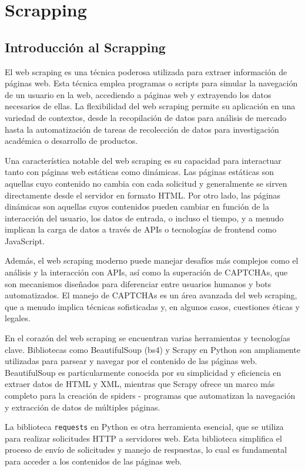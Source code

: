 \chapter{Scrapping}

    \section{Introducción al Scrapping}

    El web scraping es una técnica poderosa utilizada para extraer información de páginas web. Esta técnica emplea programas o scripts para simular la navegación de un usuario en la web, accediendo a páginas web y extrayendo los datos necesarios de ellas. La flexibilidad del web scraping permite su aplicación en una variedad de contextos, desde la recopilación de datos para análisis de mercado hasta la automatización de tareas de recolección de datos para investigación académica o desarrollo de productos.

    Una característica notable del web scraping es su capacidad para interactuar tanto con páginas web estáticas como dinámicas. Las páginas estáticas son aquellas cuyo contenido no cambia con cada solicitud y generalmente se sirven directamente desde el servidor en formato HTML. Por otro lado, las páginas dinámicas son aquellas cuyos contenidos pueden cambiar en función de la interacción del usuario, los datos de entrada, o incluso el tiempo, y a menudo implican la carga de datos a través de APIs o tecnologías de frontend como JavaScript.

    Además, el web scraping moderno puede manejar desafíos más complejos como el análisis y la interacción con APIs, así como la superación de CAPTCHAs, que son mecanismos diseñados para diferenciar entre usuarios humanos y bots automatizados. El manejo de CAPTCHAs es un área avanzada del web scraping, que a menudo implica técnicas sofisticadas y, en algunos casos, cuestiones éticas y legales.

    En el corazón del web scraping se encuentran varias herramientas y tecnologías clave. Bibliotecas como BeautifulSoup (bs4) y Scrapy en Python son ampliamente utilizadas para parsear y navegar por el contenido de las páginas web. BeautifulSoup es particularmente conocida por su simplicidad y eficiencia en extraer datos de HTML y XML, mientras que Scrapy ofrece un marco más completo para la creación de spiders - programas que automatizan la navegación y extracción de datos de múltiples páginas.

    La biblioteca \texttt{requests} en Python es otra herramienta esencial, que se utiliza para realizar solicitudes HTTP a servidores web. Esta biblioteca simplifica el proceso de envío de solicitudes y manejo de respuestas, lo cual es fundamental para acceder a los contenidos de las páginas web.

